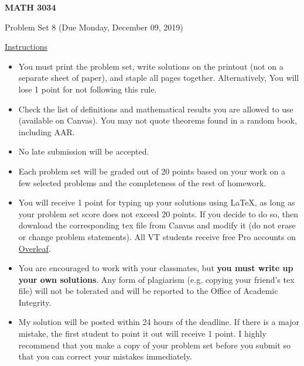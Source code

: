 \documentclass[12pt]{amsart}
\begin{document}

\hfill{}

\vspace{0.3in}
\begin{center}
{\Large{\textbf{MATH 3034}}}

\vspace{0.1in}
{\large{Problem Set 8 (Due Monday, December 09, 2019)}}
\end{center}

\vspace{0.3in}
\noindent
\underline{Instructions}
\begin{itemize}
\vspace{0.1in}
\item You must print the problem set, write solutions on the printout (not on a separate sheet of paper), and staple all pages together.  Alternatively,  You will lose 1 point for not following this rule.
\vspace{0.1in}
\item Check the list of definitions and mathematical results you are allowed to use (available on Canvas).  You may not quote theorems found in a random book, including AAR.
\vspace{0.1in}
\item No late submission will be accepted.
\vspace{0.1in}
\item Each problem set will be graded out of 20 points based on your work on a few selected problems and the completeness of the rest of homework.
\vspace{0.1in}
\item You will receive 1 point for typing up your solutions using \LaTeX, as long as your problem set score does not exceed 20 points.  If you decide to do so, then download the corresponding tex file from Canvas and modify it (do not erase or change problem statements).  All VT students receive free Pro accounts on \href{https://www.overleaf.com/edu/vtech}{Overleaf}.
\vspace{0.1in}
\item You are encouraged to work with your classmates, but \textbf{you must write up your own solutions}.  Any form of plagiarism (e.g. copying your friend's tex file) will not be tolerated and will be reported to the Office of Academic Integrity.
\vspace{0.1in}
\item My solution will be posted within 24 hours of the deadline.  If there is a major mistake, the first student to point it out will receive 1 point.  I highly recommend that you make a copy of your problem set before you submit so that you can correct your mistakes immediately.
\end{itemize}
\end{document}
